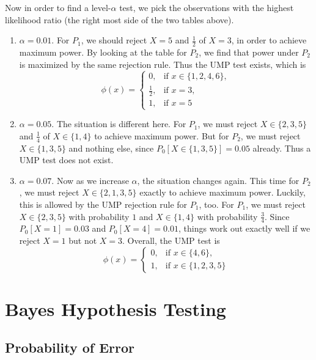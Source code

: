 \documentclass[12pt]{article}
\begin{document}
Now in order to find a level-$\alpha$ test,
we pick the observations with the highest likelihood ratio
(the right most side of the two tables above).
\begin{enumerate}
\item $\alpha = 0.01$.
  For $P_1$,
  we should reject $X = 5$ and $\frac{1}{2}$ of $X = 3$,
  in order to achieve maximum power.
  By looking at the table for $P_2$,
  we find that power under $P_2$ is maximized by the same rejection rule.
  Thus the UMP test exists, which is
  \[
    \phi(x) = \left.
    \begin{cases}
      0, & \text{if  } x \in \{1, 2, 4, 6\}, \\
      \frac{1}{2}, & \text{if  } x = 3, \\
      1, & \text{if  } x = 5
    \end{cases}
    \right.
  \]
\item $\alpha = 0.05$.
  The situation is different here.
  For $P_1$,
  we must reject $X \in \{2,3,5\}$ and $\frac{1}{4}$ of $X \in \{1,4\}$
  to achieve maximum power.
  But for $P_2$,
  we must reject $X \in \{1,3, 5\}$ and nothing else,
  since $P_0[X \in \{1,3,5\}] = 0.05$ already.
  Thus a UMP test does not exist.
\item $\alpha = 0.07$.
  Now as we increase $\alpha$, the situation changes again.
  This time for $P_2$,
  we must reject $X \in \{2,1,3,5\}$ exactly to achieve maximum power.
  Luckily, this is allowed by the UMP rejection rule for $P_1$, too.
  For $P_1$,
  we must reject $X \in \{2, 3, 5\}$ with probability $1$ and $X \in \{1,4\}$ with probability $\frac{3}{4}$.
  Since $P_0[X=1] = 0.03$ and $P_0[X=4] = 0.01$,
  things work out exactly well if we reject $X=1$ but not $X=3$.
  Overall, the UMP test is
  \[
    \phi(x) = \left.
    \begin{cases}
      0, & \text{if  } x \in \{4, 6\}, \\
      1, & \text{if  } x \in \{1,2,3,5\}
    \end{cases}
    \right.
  \]
\end{enumerate}

\section{Bayes Hypothesis Testing}

\subsection{Probability of Error}
\end{document}
